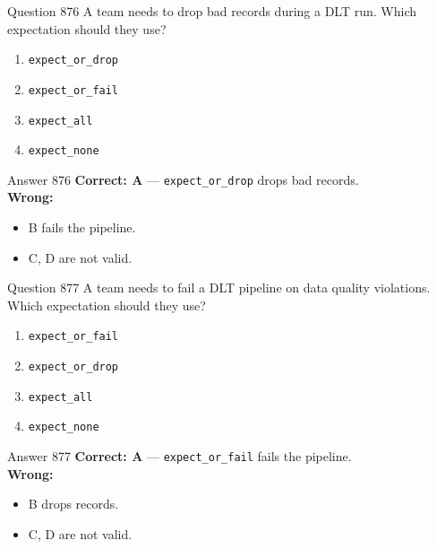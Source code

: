 \documentclass[aspectratio=169,11pt]{beamer}
\begin{document}
	\begin{frame}{Question 876}
		A team needs to drop bad records during a DLT run. Which expectation should they use?
		\begin{enumerate}[label=\Alph*.]
			\item \texttt{expect\_or\_drop}
			\item \texttt{expect\_or\_fail}
			\item \texttt{expect\_all}
			\item \texttt{expect\_none}
		\end{enumerate}
	\end{frame}
	\begin{frame}{Answer 876}
		\textbf{Correct: A} --- \texttt{expect\_or\_drop} drops bad records.\\
		\vspace{0.5em}
		\textbf{Wrong:}
		\begin{itemize}
			\item B fails the pipeline.
			\item C, D are not valid.
		\end{itemize}
	\end{frame}
	
	\begin{frame}{Question 877}
		A team needs to fail a DLT pipeline on data quality violations. Which expectation should they use?
		\begin{enumerate}[label=\Alph*.]
			\item \texttt{expect\_or\_fail}
			\item \texttt{expect\_or\_drop}
			\item \texttt{expect\_all}
			\item \texttt{expect\_none}
		\end{enumerate}
	\end{frame}
	\begin{frame}{Answer 877}
		\textbf{Correct: A} --- \texttt{expect\_or\_fail} fails the pipeline.\\
		\vspace{0.5em}
		\textbf{Wrong:}
		\begin{itemize}
			\item B drops records.
			\item C, D are not valid.
		\end{itemize}
	\end{frame}
	
\end{document}
